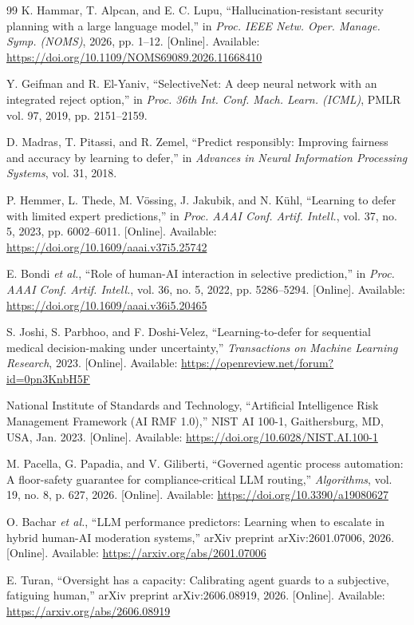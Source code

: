 \documentclass[12pt,a4paper]{article}
\begin{document}
\begin{thebibliography}{99}
 K. Hammar, T. Alpcan, and E. C. Lupu, ``Hallucination-resistant security planning with a large language model,'' in \emph{Proc. IEEE Netw. Oper. Manage. Symp. (NOMS)}, 2026, pp. 1--12. [Online]. Available: \url{https://doi.org/10.1109/NOMS69089.2026.11668410}

 Y. Geifman and R. El-Yaniv, ``SelectiveNet: A deep neural network with an integrated reject option,'' in \emph{Proc. 36th Int. Conf. Mach. Learn. (ICML)}, PMLR vol. 97, 2019, pp. 2151--2159.

 D. Madras, T. Pitassi, and R. Zemel, ``Predict responsibly: Improving fairness and accuracy by learning to defer,'' in \emph{Advances in Neural Information Processing Systems}, vol. 31, 2018.

 P. Hemmer, L. Thede, M. V\"{o}ssing, J. Jakubik, and N. K\"{u}hl, ``Learning to defer with limited expert predictions,'' in \emph{Proc. AAAI Conf. Artif. Intell.}, vol. 37, no. 5, 2023, pp. 6002--6011. [Online]. Available: \url{https://doi.org/10.1609/aaai.v37i5.25742}

 E. Bondi \emph{et al.}, ``Role of human-AI interaction in selective prediction,'' in \emph{Proc. AAAI Conf. Artif. Intell.}, vol. 36, no. 5, 2022, pp. 5286--5294. [Online]. Available: \url{https://doi.org/10.1609/aaai.v36i5.20465}

 S. Joshi, S. Parbhoo, and F. Doshi-Velez, ``Learning-to-defer for sequential medical decision-making under uncertainty,'' \emph{Transactions on Machine Learning Research}, 2023. [Online]. Available: \url{https://openreview.net/forum?id=0pn3KnbH5F}

 National Institute of Standards and Technology, ``Artificial Intelligence Risk Management Framework (AI RMF 1.0),'' NIST AI 100-1, Gaithersburg, MD, USA, Jan. 2023. [Online]. Available: \url{https://doi.org/10.6028/NIST.AI.100-1}

 M. Pacella, G. Papadia, and V. Giliberti, ``Governed agentic process automation: A floor-safety guarantee for compliance-critical LLM routing,'' \emph{Algorithms}, vol. 19, no. 8, p. 627, 2026. [Online]. Available: \url{https://doi.org/10.3390/a19080627}

 O. Bachar \emph{et al.}, ``LLM performance predictors: Learning when to escalate in hybrid human-AI moderation systems,'' arXiv preprint arXiv:2601.07006, 2026. [Online]. Available: \url{https://arxiv.org/abs/2601.07006}

 E. Turan, ``Oversight has a capacity: Calibrating agent guards to a subjective, fatiguing human,'' arXiv preprint arXiv:2606.08919, 2026. [Online]. Available: \url{https://arxiv.org/abs/2606.08919}

\end{thebibliography}
\end{document}
